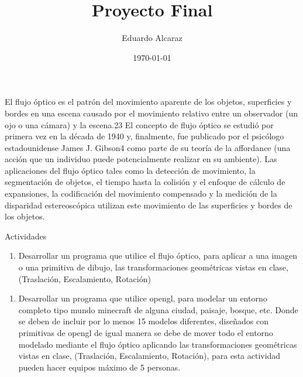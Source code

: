 \documentclass[11pt]{article}
\author{Eduardo Alcaraz}
\date{\today}
\title{Proyecto Final}
\begin{document}
\maketitle
\tableofcontents

El flujo óptico es el patrón del movimiento aparente de los objetos,
superficies y bordes en una escena causado por el movimiento relativo
entre un observador (un ojo o una cámara) y la escena.2​3​ El concepto
de flujo óptico se estudió por primera vez en la década de 1940 y,
finalmente, fue publicado por el psicólogo estadounidense James
J. Gibson4​ como parte de su teoría de la affordance (una acción que un
individuo puede potencialmente realizar en su ambiente). Las
aplicaciones del flujo óptico tales como la detección de movimiento,
la segmentación de objetos, el tiempo hasta la colisión y el enfoque
de cálculo de expansiones, la codificación del movimiento compensado y
la medición de la disparidad estereoscópica utilizan este movimiento
de las superficies y bordes de los objetos.

Actividades

\begin{enumerate}
\item Desarrollar un programa que utilice el flujo óptico, para aplicar a
una imagen o una primitiva de dibujo, las transformaciones
geométricas vistas en clase, (Traslación, Escalamiento, Rotación)
\end{enumerate}


\begin{enumerate}
\item Desarrollar un programa que utilice opengl, para modelar un entorno
completo tipo mundo minecraft de alguna ciudad, paisaje, bosque,
etc. Donde se deben de incluir por lo menos 15 modelos diferentes,
diseñados con primitivas de opengl de igual manera se debe de mover
todo el entorno modelado mediante el flujo óptico aplicando las
transformaciones geométricas vistas en clase, (Traslación,
Escalamiento, Rotación), para esta actividad pueden hacer equipos
máximo de 5 personas.
\end{enumerate}
\end{document}
